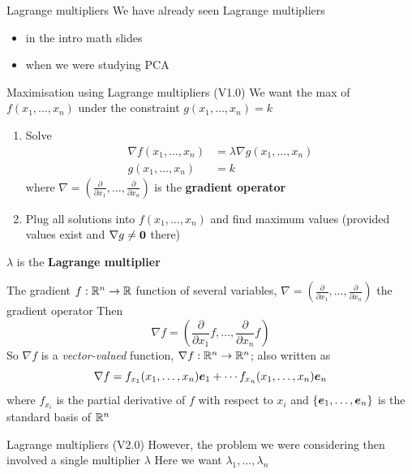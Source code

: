 \documentclass[aspectratio=169]{beamer}\usepackage[]{graphicx}\usepackage[]{xcolor}
\begin{document}
\begin{frame}{Lagrange multipliers}
    We have already seen Lagrange multipliers
    \vfill
    \begin{itemize}
    \item in the intro math slides
    \vfill
    \item when we were studying PCA
    \end{itemize}
\end{frame}

\begin{frame}{Maximisation using Lagrange multipliers (V1.0)}
    We want the max of $f(x_1,\ldots,x_n)$ under the constraint $g(x_1,\ldots,x_n)=k$
    \begin{enumerate}
    \item Solve
    \begin{align*}
    \nabla f(x_1,\ldots,x_n) &= \lambda\nabla g(x_1,\ldots,x_n) \\
    g(x_1,\ldots,x_n) &= k
    \end{align*}
    where $\nabla=(\frac{\partial}{\partial x_1},\ldots,\frac{\partial}{\partial x_n})$ is the \textbf{gradient operator}
    \item Plug all solutions into $f(x_1,\ldots,x_n)$ and find maximum values (provided values exist and $\nabla g\neq \b0$ there)
    \end{enumerate}
    \vfill
    $\lambda$ is the \textbf{Lagrange multiplier}
\end{frame}
    
    
\begin{frame}{The gradient}
    $f:\mathbb{R}^n\to\mathbb{R}$ function of several variables, $\nabla=\left(\frac{\partial}{\partial x_1},\ldots,\frac{\partial}{\partial x_n}\right)$ the gradient operator
    \vfill
    Then
    \[
    \nabla f = \left(
    \frac{\partial}{\partial x_1}f,\ldots,
    \frac{\partial}{\partial x_n}f
    \right)
    \]
    \vfill
    So $\nabla f$ is a \emph{vector-valued} function, $\nabla f:\mathbb{R}^n\to\mathbb{R}^n$; also written as
    \[
    \nabla f = f_{x_1}(x_1,\ldots,x_n)\bm{e}_1+\cdots f_{x_n}(x_1,\ldots,x_n)\bm{e}_n
    \]
    where $f_{x_i}$ is the partial derivative of $f$ with respect to $x_i$ and $\{\bm{e}_1,\ldots,\bm{e}_n\}$ is the standard basis of $\mathbb{R}^n$
\end{frame}

\begin{frame}{Lagrange multipliers (V2.0)}
        However, the problem we were considering then involved a single multiplier $\lambda$
        \vfill
        Here we want $\lambda_1,\ldots,\lambda_n$
\end{frame}
\end{document}
